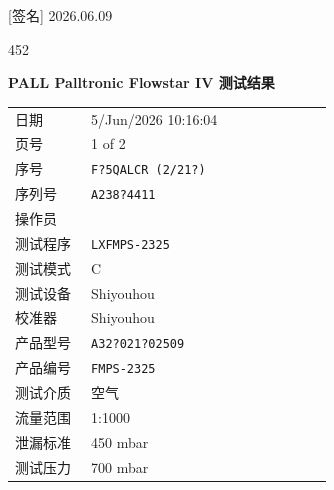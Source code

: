 \documentclass[UTF8,10pt,a4paper,fontset=fandol]{ctexart}
\newcommand{\fieldvalue}[1]{#1}
\newcommand{\handwritten}[1]{#1}
\begin{document}

\handwritten{[签名] 2026.06.09}

\handwritten{452}

\newpage

\begin{center}
\textbf{PALL Palltronic Flowstar IV 测试结果}
\end{center}

\begin{tabular}{@{}p{0.22\linewidth}p{0.70\linewidth}@{}}
日期 &
\fieldvalue{5/Jun/2026 10:16:04}
\\
页号 &
\fieldvalue{1 of 2}
\\
序号 &
\fieldvalue{\texttt{F?5QALCR (2/21?)}}
\\
序列号 &
\fieldvalue{\texttt{A238?4411}}
\\
操作员 & \\
测试程序 &
\fieldvalue{\texttt{LXFMPS-2325}}
\\
测试模式 &
\fieldvalue{C}
\\
测试设备 &
\fieldvalue{Shiyouhou}
\\
校准器 &
\fieldvalue{Shiyouhou}
\\
产品型号 &
\fieldvalue{\texttt{A32?021?02509}}
\\
产品编号 &
\fieldvalue{\texttt{FMPS-2325}}
\\
测试介质 &
\fieldvalue{空气}
\\
流量范围 &
\fieldvalue{1:1000}
\\
泄漏标准 &
\fieldvalue{450 mbar}
\\
测试压力 &
\fieldvalue{700 mbar}
\end{tabular}
\end{document}
